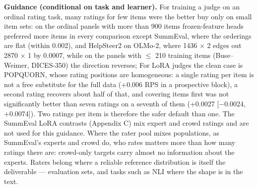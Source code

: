 \documentclass{article}
\begin{document}
\textbf{Guidance (conditional on task and learner).} For training a judge on an ordinal rating task, many ratings for few items were the better buy only on small item sets: on the ordinal panels with more than 900 items frozen-feature heads preferred more items in every comparison except SummEval, where the orderings are flat (within 0.002), and HelpSteer2 on OLMo-2, where 1436 $\times$ 2 edges out 2870 $\times$ 1 by 0.0007, while on the panels with $\leq$ 210 training items (Buse--Weimer, DICES-350) the direction reverses; For LoRA judges the clean case is POPQUORN, whose rating positions are homogeneous: a single rating per item is not a free substitute for the full data (+0.006 RPS in a prospective block), a second rating recovers about half of that, and covering items first was not significantly better than seven ratings on a seventh of them (+0.0027 {[}$-$0.0024, +0.0074{]}). Two ratings per item is therefore the safer default than one. The SummEval LoRA contrasts (Appendix C) mix expert and crowd ratings and are not used for this guidance. Where the rater pool mixes populations, as SummEval's experts and crowd do, who rates matters more than how many ratings there are: crowd-only targets carry almost no information about the experts. Raters belong where a reliable reference distribution is itself the deliverable --- evaluation sets, and tasks such as NLI where the shape is in the text.
\end{document}
